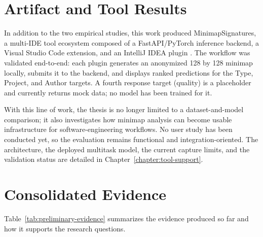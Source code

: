 \section{Artifact and Tool Results}

In addition to the two empirical studies, this work produced MinimapSignatures,
a multi-IDE tool ecosystem composed of a FastAPI/PyTorch inference backend, a
Visual Studio Code extension, and an IntelliJ IDEA plugin
\cite{gebara2026minimapsignatures}. The workflow was validated end-to-end: each
plugin generates an anonymized 128 by 128 minimap locally, submits it to the
backend, and displays ranked predictions for the Type, Project, and Author
targets. A fourth response target (quality) is a placeholder and currently
returns mock data; no model has been trained for it.

With this line of work, the thesis is no longer limited to a dataset-and-model
comparison; it also investigates how minimap analysis can become usable
infrastructure for software-engineering workflows. No user study
has been conducted yet, so the evaluation remains functional and
integration-oriented. The architecture, the deployed multitask model, the
current capture limits, and the validation status are detailed in
Chapter~\ref{chapter:tool-support}.

\section{Consolidated Evidence}

Table~\ref{tab:preliminary-evidence} summarizes the evidence produced so far and
how it supports the research questions.

